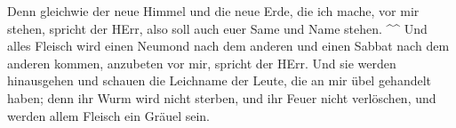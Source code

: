  Denn gleichwie der neue Himmel und die neue Erde, die
ich mache, vor mir stehen, spricht der HErr, also soll auch euer Same
und Name stehen. \^{}\^{}  Und alles Fleisch wird einen
Neumond nach dem anderen und einen Sabbat nach dem anderen kommen,
anzubeten vor mir, spricht der HErr.  Und sie werden
hinausgehen und schauen die Leichname der Leute, die an mir übel
gehandelt haben; denn ihr Wurm wird nicht sterben, und ihr Feuer nicht
verlöschen, und werden allem Fleisch ein Gräuel sein.
